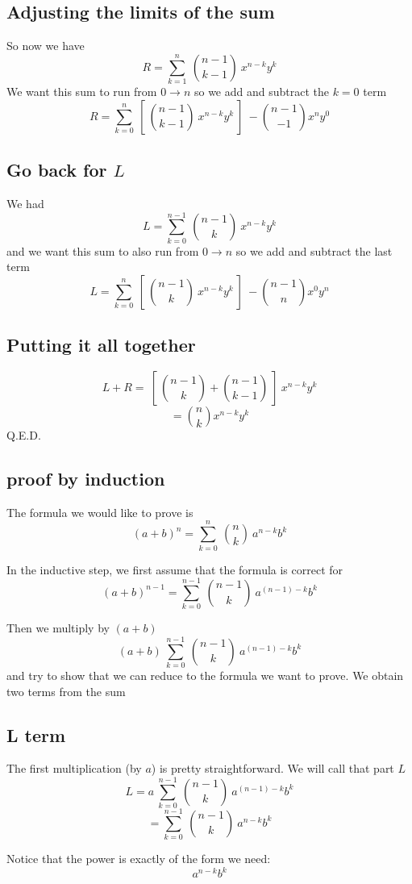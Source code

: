\documentclass[11pt, oneside]{article}   	%
\begin{document}
\subsection*{Adjusting the limits of the sum}
So now we have
\[ R = \sum_{k=1}^{n} \ {n-1 \choose k-1} \ x^{n-k}y^{k} \]
We want this sum to run from $0 \to n$ so we add and subtract the $k=0$ term
\[ R = \sum_{k=0}^{n} \ [ \ {n-1 \choose k-1} \ x^{n-k}y^{k} \ ] \  - {n-1 \choose -1}x^ny^0 \]
\subsection*{Go back for $L$}
We had
\[ L = \sum_{k=0}^{n-1} \ {n-1 \choose k} \ x^{n-k}y^k \]
and we want this sum to also run from $0 \to n$ so we add and subtract the last term
\[ L = \sum_{k=0}^{n}  \ [ \  {n-1 \choose k} \ x^{n-k}y^k  \ ] \  - {n-1 \choose n}x^0y^n \]
\subsection*{Putting it all together}
\[ L + R = \ [ \ {n-1 \choose k} + {n-1 \choose k-1} \ ] \ x^{n-k}y^k \]
\[ = {n \choose k}x^{n-k}y^k \]
Q.E.D.

\subsection*{proof by induction}

The formula we would like to prove is
\[ (a+b)^n = \sum_{k=0}^{n} \ {n \choose k} \ a^{n-k}b^k \]

In the inductive step, we first assume that the formula is correct for 
\[ (a+b)^{n-1} = \sum_{k=0}^{n-1} \ {n-1 \choose k} \ a^{(n-1)-k}b^k \]

Then we multiply by $(a+b)$
\[ (a+b) \ \sum_{k=0}^{n-1} \ {n-1 \choose k} \ a^{(n-1)-k}b^k \]
and try to show that we can reduce to the formula we want to prove.  We obtain two terms from the sum

\subsection*{L term}

The first multiplication (by $a$) is pretty straightforward.  We will call that part $L$
\[ L = a \ \sum_{k=0}^{n-1} \ {n-1 \choose k} \ a^{(n-1)-k}b^k \]
\[ = \sum_{k=0}^{n-1} \ {n-1 \choose k} \ a^{n-k}b^k \]

Notice that the power is exactly of the form we need:
\[ a^{n-k}b^k \]
\end{document}
